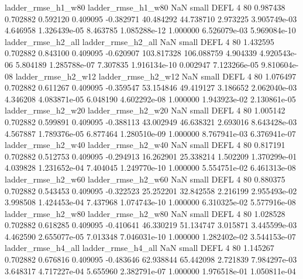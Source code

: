       ladder_rmse_h1_w80       ladder_rmse_h1_w80                   NaN      small     DEFL                 4 80 0.987438       0.702882 0.592120       0.409095   -0.382971     40.484292     44.738710     2.973225   3.905749e-03  4.646958 1.326439e-05     8.463785   1.085288e-12            1.000000    6.526079e-03        5.969084e-10
      ladder_rmse_h2_all       ladder_rmse_h2_all                   NaN      small     DEFL                 4 80 1.432595       0.702882 0.843100       0.409095   -0.620907    103.817328    106.088759     4.904339   4.920543e-06  5.804189 1.285788e-07     7.307835   1.916134e-10            0.002947    7.123266e-05        9.810604e-08
      ladder_rmse_h2_w12       ladder_rmse_h2_w12                   NaN      small     DEFL                 4 80 1.076497       0.702882 0.611267       0.409095   -0.359547     53.154846     49.419127     3.186652   2.062040e-03  4.346208 4.083871e-05     6.048190   4.602292e-08            1.000000    1.943923e-02        2.130861e-05
      ladder_rmse_h2_w20       ladder_rmse_h2_w20                   NaN      small     DEFL                 4 80 1.005142       0.702882 0.599891       0.409095   -0.388113     43.002949     46.638321     2.693016   8.643428e-03  4.567887 1.789376e-05     6.877464   1.280510e-09            1.000000    8.767941e-03        6.376941e-07
      ladder_rmse_h2_w40       ladder_rmse_h2_w40                   NaN      small     DEFL                 4 80 0.817191       0.702882 0.512753       0.409095   -0.294913     16.262901     25.338214     1.502209   1.370299e-01  4.039828 1.231652e-04     7.404045   1.249770e-10            1.000000    5.554751e-02        6.461313e-08
      ladder_rmse_h2_w60       ladder_rmse_h2_w60                   NaN      small     DEFL                 4 80 0.880375       0.702882 0.543453       0.409095   -0.322523     25.252201     32.842558     2.216199   2.955493e-02  3.998508 1.424453e-04     7.437968   1.074743e-10            1.000000    6.310325e-02        5.577916e-08
      ladder_rmse_h2_w80       ladder_rmse_h2_w80                   NaN      small     DEFL                 4 80 1.028528       0.702882 0.618285       0.409095   -0.410641     46.330219     51.134747     3.015871   3.445599e-03  4.462590 2.655077e-05     7.013348   7.046031e-10            1.000000    1.282402e-02        3.544153e-07
      ladder_rmse_h4_all       ladder_rmse_h4_all                   NaN      small     DEFL                 4 80 1.145267       0.702882 0.676816       0.409095   -0.483646     62.938844     65.442098     2.721839   7.984297e-03  3.648317 4.717227e-04     5.655960   2.382791e-07            1.000000    1.976518e-01        1.050811e-04
